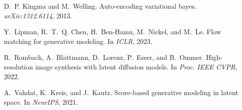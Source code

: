 \documentclass{article}
\begin{document}
\begin{thebibliography}{9}
D.~P. Kingma and M.~Welling.
\newblock Auto-encoding variational bayes.
\newblock \emph{arXiv:1312.6114}, 2013.

Y.~Lipman, R.~T.~Q. Chen, H.~Ben-Hamu, M.~Nickel, and M.~Le.
\newblock Flow matching for generative modeling.
\newblock In \emph{ICLR}, 2023.

R.~Rombach, A.~Blattmann, D.~Lorenz, P.~Esser, and B.~Ommer.
\newblock High-resolution image synthesis with latent diffusion models.
\newblock In \emph{Proc. IEEE CVPR}, 2022.

A.~Vahdat, K.~Kreis, and J.~Kautz.
\newblock Score-based generative modeling in latent space.
\newblock In \emph{NeurIPS}, 2021.

\end{thebibliography}
\end{document}
